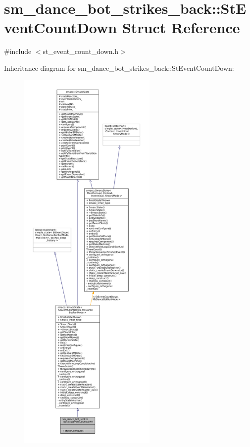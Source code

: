 \hypertarget{structsm__dance__bot__strikes__back_1_1StEventCountDown}{}\section{sm\+\_\+dance\+\_\+bot\+\_\+strikes\+\_\+back\+:\+:St\+Event\+Count\+Down Struct Reference}
\label{structsm__dance__bot__strikes__back_1_1StEventCountDown}


{\ttfamily \#include $<$st\+\_\+event\+\_\+count\+\_\+down.\+h$>$}



Inheritance diagram for sm\+\_\+dance\+\_\+bot\+\_\+strikes\+\_\+back\+:\+:St\+Event\+Count\+Down\+:
\nopagebreak
\begin{figure}[H]
\begin{center}
\leavevmode
\includegraphics[height=550pt]{structsm__dance__bot__strikes__back_1_1StEventCountDown__inherit__graph}
\end{center}
\end{figure}


